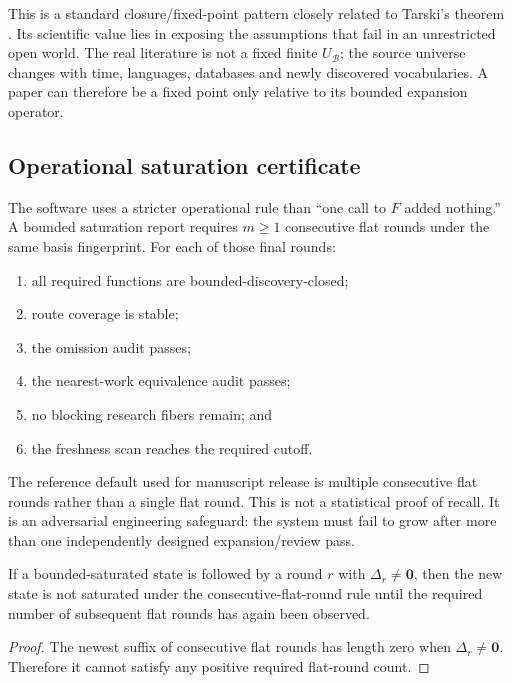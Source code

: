 This is a standard closure/fixed-point pattern closely related to Tarski's theorem \cite{tarski1955}. Its scientific value lies in exposing the assumptions that fail in an unrestricted open world. The real literature is not a fixed finite \(U_{\mathcal B}\); the source universe changes with time, languages, databases and newly discovered vocabularies. A paper can therefore be a fixed point only relative to its bounded expansion operator.

\subsection{Operational saturation certificate}

The software uses a stricter operational rule than ``one call to \(F\) added nothing.'' A bounded saturation report requires \(m\ge1\) consecutive flat rounds under the same basis fingerprint. For each of those final rounds:

\begin{enumerate}[leftmargin=*]
\item all required functions are bounded-discovery-closed;
\item route coverage is stable;
\item the omission audit passes;
\item the nearest-work equivalence audit passes;
\item no blocking research fibers remain; and
\item the freshness scan reaches the required cutoff.
\end{enumerate}

The reference default used for manuscript release is multiple consecutive flat rounds rather than a single flat round. This is not a statistical proof of recall. It is an adversarial engineering safeguard: the system must fail to grow after more than one independently designed expansion/review pass.

\begin{proposition}
If a bounded-saturated state is followed by a round \(r\) with \(\Delta_r\ne\mathbf0\), then the new state is not saturated under the consecutive-flat-round rule until the required number of subsequent flat rounds has again been observed.
\end{proposition}

\begin{proof}
The newest suffix of consecutive flat rounds has length zero when \(\Delta_r\ne\mathbf0\). Therefore it cannot satisfy any positive required flat-round count.
\end{proof}

